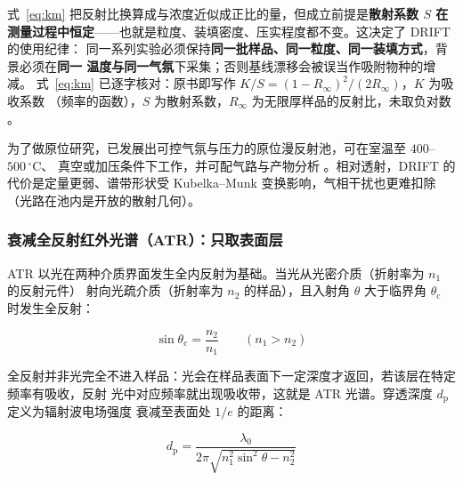 \begin{keycond}
式~\eqref{eq:km} 把反射比换算成与浓度近似成正比的量，但成立前提是\textbf{散射系数 $S$ 在
测量过程中恒定}——也就是粒度、装填密度、压实程度都不变。这决定了 DRIFT 的使用纪律：
同一系列实验必须保持\textbf{同一批样品、同一粒度、同一装填方式}，背景必须在\textbf{同一
温度与同一气氛}下采集；否则基线漂移会被误当作吸附物种的增减。
式~\eqref{eq:km} 已逐字核对：原书即写作 $K/S=(1-R_{\infty})^{2}/(2R_{\infty})$，$K$ 为吸收系数
（频率的函数），$S$ 为散射系数，$R_{\infty}$ 为无限厚样品的反射比，未取负对数
。
\end{keycond}

为了做原位研究，已发展出可控气氛与压力的原位漫反射池，可在室温至 $400$--$500\,^{\circ}\mathrm{C}$、
真空或加压条件下工作，并可配气路与产物分析
。相对透射，DRIFT 的代价是定量更弱、谱带形状受
Kubelka--Munk 变换影响，气相干扰也更难扣除（光路在池内是开放的散射几何）。

\subsubsection{衰减全反射红外光谱（ATR）：只取表面层}

ATR 以光在两种介质界面发生全内反射为基础。当光从光密介质（折射率为 $n_{1}$ 的反射元件）
射向光疏介质（折射率为 $n_{2}$ 的样品），且入射角 $\theta$ 大于临界角 $\theta_{\mathrm{c}}$
时发生全反射：

\begin{equation}\label{eq:crit}
\sin\theta_{\mathrm{c}}=\frac{n_{2}}{n_{1}}\qquad\left(n_{1}>n_{2}\right)
\end{equation}

全反射并非光完全不进入样品：光会在样品表面下一定深度才返回，若该层在特定频率有吸收，反射
光中对应频率就出现吸收带，这就是 ATR 光谱。穿透深度 $d_{\mathrm{p}}$ 定义为辐射波电场强度
衰减至表面处 $1/e$ 的距离：

\begin{equation}\label{eq:dpen}
d_{\mathrm{p}}=\frac{\lambda_{0}}{2\pi\sqrt{n_{1}^{2}\sin^{2}\theta-n_{2}^{2}}}
\end{equation}


